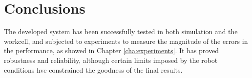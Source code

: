 
\chapter{Conclusions} %
\label{cha:conclusions}
The developed system has been successfully tested in both simulation and the workcell, and subjected to experiments to measure the magnitude of the errors in the performance, as showed in Chapter \ref{cha:experiments}.
It has proved robustness and reliability, although certain limits imposed by the robot conditions hve constrained the goodness of the final results.



